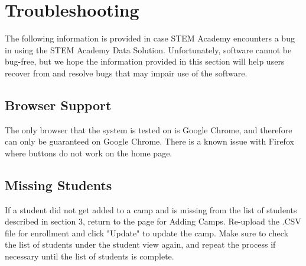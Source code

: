 \documentclass[letterpaper,10pt,serif, draftclsnofoot,onecolumn, compsoc, titlepage]{IEEEtran}
\begin{document}
\section{Troubleshooting}
The following information is provided in case STEM Academy encounters a bug in using the STEM Academy Data Solution.
Unfortunately, software cannot be bug-free, but we hope the information provided in this section will help users recover from and resolve bugs that may impair use of the software.
\subsection{Browser Support}
The only browser that the system is tested on is Google Chrome, and therefore can only be guaranteed on Google Chrome.
There is a known issue with Firefox where buttons do not work on the home page.
\subsection{Missing Students}
If a student did not get added to a camp and is missing from the list of students described in section 3, return to the page for Adding Camps.
Re-upload the .CSV file for enrollment and click "Update" to update the camp.
Make sure to check the list of students under the student view again, and repeat the process if necessary until the list of students is complete.
\end{document}
